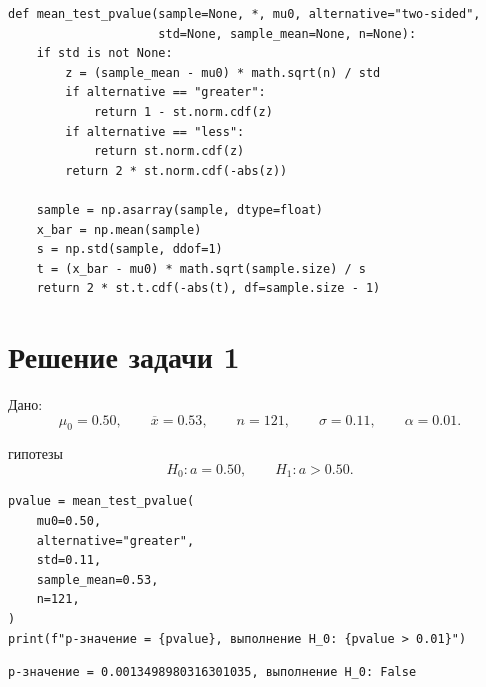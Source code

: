 \documentclass[a4paper,14pt]{extarticle}
\begin{document}
\begin{lstlisting}
def mean_test_pvalue(sample=None, *, mu0, alternative="two-sided",
                     std=None, sample_mean=None, n=None):
    if std is not None:
        z = (sample_mean - mu0) * math.sqrt(n) / std
        if alternative == "greater":
            return 1 - st.norm.cdf(z)
        if alternative == "less":
            return st.norm.cdf(z)
        return 2 * st.norm.cdf(-abs(z))

    sample = np.asarray(sample, dtype=float)
    x_bar = np.mean(sample)
    s = np.std(sample, ddof=1)
    t = (x_bar - mu0) * math.sqrt(sample.size) / s
    return 2 * st.t.cdf(-abs(t), df=sample.size - 1)

\end{lstlisting}

\section{Решение задачи 1}

Дано:
\[
\mu_0=0.50,\qquad \overline{x}=0.53,\qquad n=121,\qquad \sigma=0.11,\qquad \alpha=0.01.
\]

 гипотезы
\[
H_0:a=0.50,
\qquad
H_1:a>0.50.
\]







\begin{lstlisting}
pvalue = mean_test_pvalue(
    mu0=0.50,
    alternative="greater",
    std=0.11,
    sample_mean=0.53,
    n=121,
)
print(f"p-значение = {pvalue}, выполнение H_0: {pvalue > 0.01}")
\end{lstlisting}


\begin{lstlisting}
p-значение = 0.0013498980316301035, выполнение H_0: False
\end{lstlisting}
\end{document}

